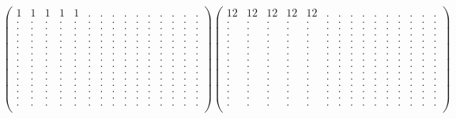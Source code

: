 \documentclass[12pt,a4paper]{amsart}
\begin{document}
\begin{align*}
\left(\begin{array}{rrrrrrrrrrrrrrr}%
1&1&1&1&1&.&.&.&.&.&.&.&.&.&.\\%
.&.&.&.&.&.&.&.&.&.&.&.&.&.&.\\%
.&.&.&.&.&.&.&.&.&.&.&.&.&.&.\\%
.&.&.&.&.&.&.&.&.&.&.&.&.&.&.\\%
.&.&.&.&.&.&.&.&.&.&.&.&.&.&.\\%
.&.&.&.&.&.&.&.&.&.&.&.&.&.&.\\%
.&.&.&.&.&.&.&.&.&.&.&.&.&.&.\\%
.&.&.&.&.&.&.&.&.&.&.&.&.&.&.\\%
.&.&.&.&.&.&.&.&.&.&.&.&.&.&.\\%
.&.&.&.&.&.&.&.&.&.&.&.&.&.&.\\%
.&.&.&.&.&.&.&.&.&.&.&.&.&.&.\\%
.&.&.&.&.&.&.&.&.&.&.&.&.&.&.\\%
.&.&.&.&.&.&.&.&.&.&.&.&.&.&.\\%
.&.&.&.&.&.&.&.&.&.&.&.&.&.&.\\%
.&.&.&.&.&.&.&.&.&.&.&.&.&.&.\\%
\end{array}\right)%
\left(\begin{array}{rrrrrrrrrrrrrrr}%
12&12&12&12&12&.&.&.&.&.&.&.&.&.&.\\%
.&.&.&.&.&.&.&.&.&.&.&.&.&.&.\\%
.&.&.&.&.&.&.&.&.&.&.&.&.&.&.\\%
.&.&.&.&.&.&.&.&.&.&.&.&.&.&.\\%
.&.&.&.&.&.&.&.&.&.&.&.&.&.&.\\%
.&.&.&.&.&.&.&.&.&.&.&.&.&.&.\\%
.&.&.&.&.&.&.&.&.&.&.&.&.&.&.\\%
.&.&.&.&.&.&.&.&.&.&.&.&.&.&.\\%
.&.&.&.&.&.&.&.&.&.&.&.&.&.&.\\%
.&.&.&.&.&.&.&.&.&.&.&.&.&.&.\\%
.&.&.&.&.&.&.&.&.&.&.&.&.&.&.\\%
.&.&.&.&.&.&.&.&.&.&.&.&.&.&.\\%
.&.&.&.&.&.&.&.&.&.&.&.&.&.&.\\%
.&.&.&.&.&.&.&.&.&.&.&.&.&.&.\\%
.&.&.&.&.&.&.&.&.&.&.&.&.&.&.\\%
\end{array}\right)%
\end{align*}
\end{document}
